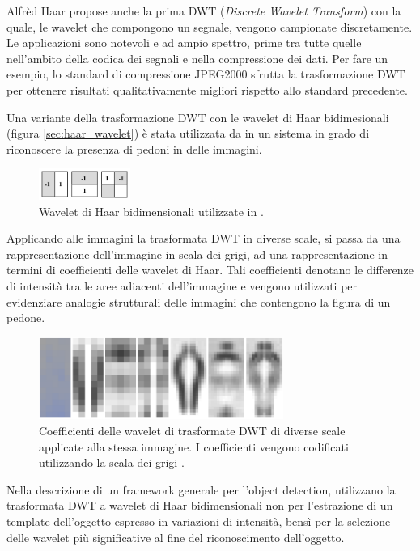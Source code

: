 Alfrèd Haar propose anche la prima DWT (\emph{Discrete Wavelet Transform}) con la quale, le wavelet che compongono un segnale, vengono campionate discretamente.
Le applicazioni sono notevoli e ad ampio spettro, prime tra tutte quelle nell'ambito della codica dei segnali e nella compressione dei dati. Per fare un esempio, lo standard di compressione JPEG2000 sfrutta la trasformazione DWT \cite{Jpeg2000} per ottenere risultati qualitativamente migliori rispetto allo standard precedente.

Una variante della trasformazione DWT con le wavelet di Haar bidimesionali (figura \ref{sec:haar_wavelet}) è stata utilizzata da \citet{Oren97} in un sistema in grado di riconoscere la presenza di pedoni in delle immagini.

\begin{figure}
    \centering
    \includegraphics[width=3cm]{img/haar_wavelet.png}
    \caption{Wavelet di Haar bidimensionali utilizzate in \cite{Oren97}.}
    \label{fig:haar_wavelet}
\end{figure}

Applicando alle immagini la trasformata DWT in diverse scale, si passa da una rappresentazione dell'immagine in scala dei grigi, ad una rappresentazione in termini di coefficienti delle wavelet di Haar.
Tali coefficienti denotano le differenze di intensità tra le aree adiacenti dell'immagine e vengono utilizzati per evidenziare analogie strutturali delle immagini che contengono la figura di un pedone.

\begin{figure}
    \centering
    \includegraphics[width=8cm]{img/pedestrian_dwt.png}
    \caption{Coefficienti delle wavelet di trasformate DWT di diverse scale applicate alla stessa immagine. I coefficienti vengono codificati utilizzando la scala dei grigi \cite[Figura 3]{Oren97}.}
    \label{fig:non_standard_dwt}
\end{figure}

Nella descrizione di un framework generale per l'object detection, \citet{Papageorgiou98} utilizzano la trasformata DWT a wavelet di Haar bidimensionali non per l'estrazione di un template dell'oggetto espresso in variazioni di intensità, bensì per la selezione delle wavelet più significative al fine del riconoscimento dell'oggetto.

